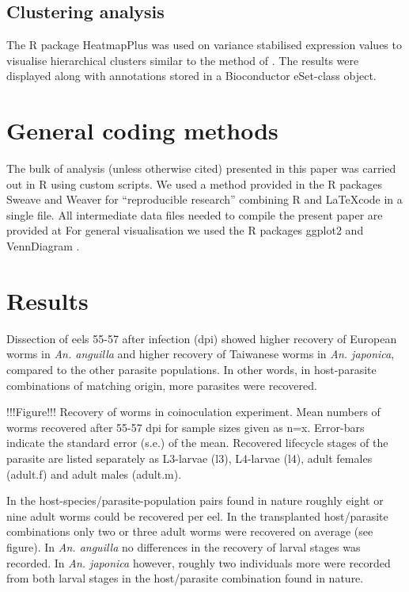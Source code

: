 \documentclass[10pt]{article}
\begin{document}
\subsection{Clustering analysis}

The R package HeatmapPlus was used on variance stabilised expression
values to visualise hierarchical clusters similar to the method of
\cite{pmid9843981}. The results were displayed along with annotations
stored in a Bioconductor eSet-class object.

\section{General coding methods}

The bulk of analysis (unless otherwise cited) presented in this paper
was carried out in R \cite{R_project} using custom scripts. We used a
method provided in the R packages Sweave
\cite{lmucs-papers:Leisch:2002} and Weaver \cite{weaver} for
``reproducible research'' combining R and \LaTeX code in a single
file. All intermediate data files needed to compile the present paper
are provided at For general visualisation we used the R packages
ggplot2 \cite{ggplot-book} and VennDiagram \cite{pmid21269502}.


\section{Results}

Dissection of eels 55-57 after infection (dpi) showed higher recovery
of European worms in \textit{An. anguilla} and higher recovery of
Taiwanese worms in \textit{An. japonica}, compared to the other
parasite populations. In other words, in host-parasite combinations of
matching origin, more parasites were recovered.

!!!Figure!!! Recovery of worms in coinoculation experiment. Mean
numbers of worms recovered after 55-57 dpi for sample sizes given as
n=x. Error-bars indicate the standard error (s.e.) of the
mean. Recovered lifecycle stages of the parasite are listed separately
as L3-larvae (l3), L4-larvae (l4), adult females (adult.f) and adult
males (adult.m).

In the host-species/parasite-population pairs found in nature roughly
eight or nine adult worms could be recovered per eel. In the
transplanted host/parasite combinations only two or three adult worms
were recovered on average (see figure). In
\textit{An. anguilla} no differences in the recovery of larval stages
was recorded. In \textit{An. japonica} however, roughly two
individuals more were recorded from both larval stages in the
host/parasite combination found in nature.
\end{document}
